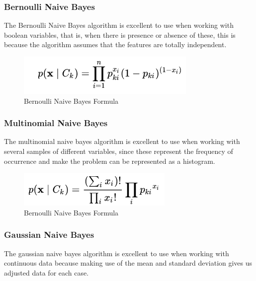 \documentclass[sigconf,12pt,review=false,natbib=false]{acmart}
\begin{document}
\subsubsection{Bernoulli Naive Bayes}

The Bernoulli Naive Bayes algorithm is excellent to use when working with boolean variables, that is,
when there is presence or absence of these, this is because the algorithm assumes that the features are
totally independent. \\

\begin{figure}[h!]
    \centering
    \includegraphics[]{bernoulli}
    \caption{Bernoulli Naive Bayes Formula}
    \label{fig:bnbf}
\end{figure}

\subsubsection{Multinomial Naive Bayes}

The multinomial naive bayes algorithm is excellent to use when working with several samples of different
variables, since these represent the frequency of occurrence and make the problem can be represented
as a histogram. \\

\begin{figure}[h!]
    \centering
    \includegraphics[]{multinomial}
    \caption{Bernoulli Naive Bayes Formula}
    \label{fig:bnbf}
\end{figure}

\subsubsection{Gaussian Naive Bayes}

The gaussian naive bayes algorithm is excellent to use when working with continuous data because making
use of the mean and standard deviation gives us adjusted data for each case. \\
\end{document}
